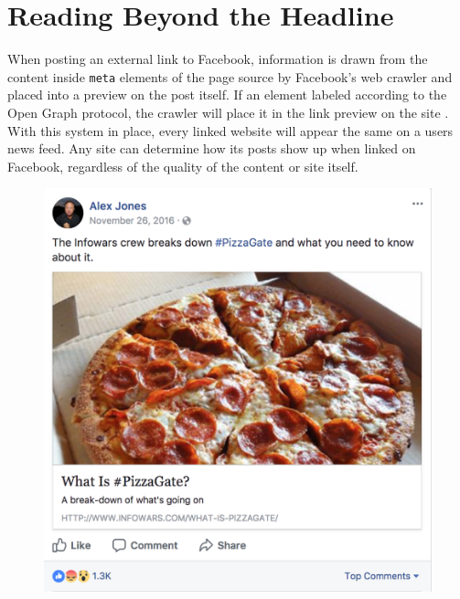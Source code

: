 \documentclass[12pt]{article}
\begin{document}
\section{Reading Beyond the Headline}
When posting an external link to Facebook, information is drawn from the content inside \texttt{meta} elements of the page source by Facebook's web crawler and placed into a preview on the post itself. If an element labeled according to the Open Graph protocol, the crawler will place it in the link preview on the site \cite{fbwebmaster}. With this system in place, every linked website will appear the same on a users news feed. Any site can determine how its posts show up when linked on Facebook, regardless of the quality of the content or site itself. \\

\begin{figure}[h]
	\begin{minipage}{0.48\textwidth}
		\centering
		\includegraphics[scale=.3]{pizzagate_alex_jones_fb}
	\end{minipage}
	\begin{minipage}{0.48\textwidth}
		\centering

\end{minipage}
\end{figure}
\end{document}
